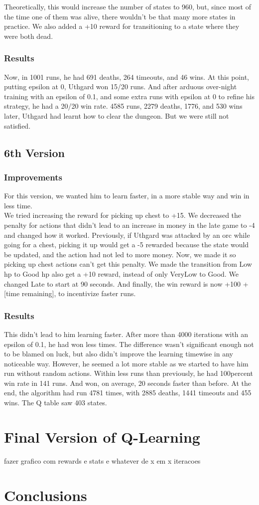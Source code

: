 \documentclass{article}
\begin{document}
  Theoretically, this would increase the number of states to 960, but, since most of the time one of them was alive, there wouldn't be that many more states in practice. 
  We also added a +10 reward for transitioning to a state where they were both dead.

  \subsubsection{Results}

  Now, in 1001 runs, he had 691 deaths, 264 timeouts, and 46 wins. At this point, putting epsilon at 0, Uthgard won 15/20 runs. And after arduous over-night training with an epsilon of 0.1, and some extra runs with epsilon at 0 to refine his strategy, he had a 20/20 win rate. 
  4585 runs, 2279 deaths, 1776, and 530 wins later, Uthgard had learnt how to clear the dungeon. But we were still not satisfied.

  \subsection{6th Version}

  \subsubsection{Improvements}

  For this version, we wanted him to learn faster, in a more stable way and win in less time.\\
  We tried increasing the reward for picking up chest to +15. We decreased the penalty for actions that didn't lead to an increase in money in the late game to -4 and changed how it worked. Previously, if Uthgard was attacked by an orc while going for a chest, picking it up would get a -5 rewarded because the state would be updated, and the action had not led to more money. 
  Now, we made it so picking up chest actions can't get this penalty. We made the transition from Low hp to Good hp also get a +10 reward, instead of only VeryLow to Good. We changed Late to start at 90 seconds. And finally, the win reward is now +100 + [time remaining], to incentivize faster runs.

  \subsubsection{Results}

  This didn't lead to him learning faster. After more than 4000 iterations with an epsilon of 0.1, he had won less times. The difference wasn't significant enough not to be blamed on luck, but also didn't improve the learning timewise in any noticeable way.
  However, he seemed a lot more stable as we started to have him run without random actions. Within less runs than previously, he had 100percent win rate in 141 runs. And won, on average, 20 seconds faster than before. At the end, the algorithm had run 4781 times, with 2885 deaths, 1441 timeouts and 455 wins. The Q table saw 403 states.

  \section{Final Version of Q-Learning}

  fazer grafico com rewards e stats e whatever de x em x iteracoes

  \section{Conclusions}
  
\end{document}
